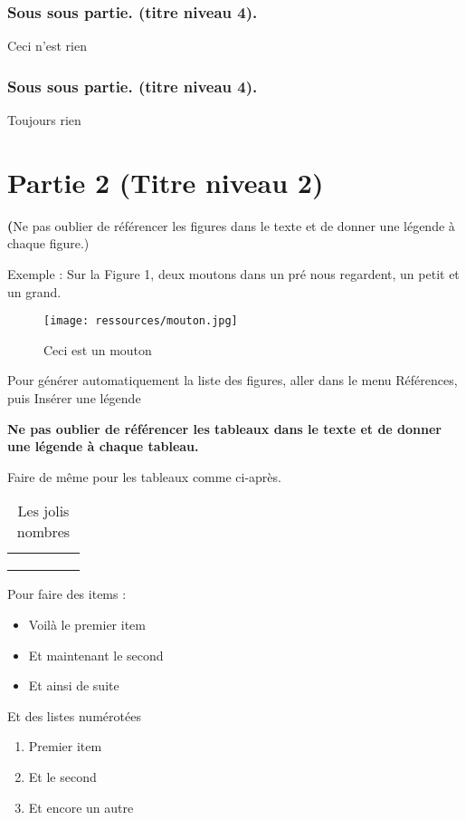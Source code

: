 \subsubsection{Sous sous partie. (titre niveau 4).}
Ceci n'est rien

\subsubsection{Sous sous partie. (titre niveau 4).}
Toujours rien

\section{Partie 2 (Titre niveau 2)}

\textbf(Ne pas oublier de référencer les figures dans le texte et de donner une légende à chaque figure.)

Exemple : Sur la Figure 1, deux moutons dans un pré nous regardent, un petit et un grand.

\begin{figure}[htbp]
    \centering
    \texttt{[image: ressources/mouton.jpg]}
    \caption{Ceci est un mouton}
    \label{fig:my_label}
\end{figure}

Pour générer automatiquement la liste des figures, aller dans le menu Références, puis Insérer une légende

\textbf{Ne pas oublier de référencer les tableaux dans le texte et de donner une légende à chaque tableau.}

Faire de même pour les tableaux comme ci-après.

\begin{table}[h]
    \centering
    \begin{tabular}{|c|c|c|c|c|}
    \hline
         & & & &  \\ \hline
         & & & &  \\ \hline
         & & & &  \\ \hline
         & & & &  \\ \hline
    \end{tabular}
    \caption{Les jolis nombres}
    \label{tab:my_label}
\end{table}

Pour faire des items :
\begin{itemize}
    \item Voilà le premier item
    \item Et maintenant le second
    \item Et ainsi de suite
\end{itemize}


Et des listes numérotées
\begin{enumerate}
    \item Premier item
    \item Et le second
    \item Et encore un autre
\end{enumerate}
